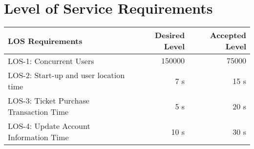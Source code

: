 \section{Level of Service Requirements}
\begin{frame}
\begin{table}[h]
    \begin{tabularx}{\textwidth}{Xrr}
    \hline
    LOS Requirements                                                                                          									& Desired Level & Accepted Level \\ \hline
    LOS-1: Concurrent Users														& $150000$		& $75000$           \\
    LOS-2: Start-up and user location time 										& 7 s  			& 15 s           \\
    LOS-3: Ticket Purchase Transaction Time										& 5 s 			& 20 s            \\
    LOS-4: Update Account Information Time										& 10 s 			& 30 s            \\
    \hline
    \end{tabularx}
\end{table}
\end{frame}